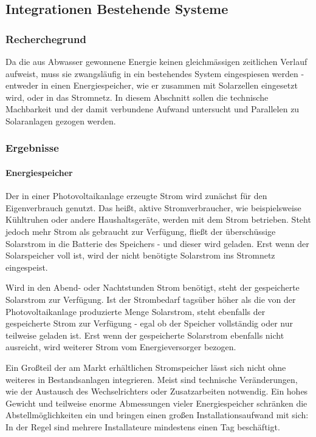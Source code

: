 \subsection{Integrationen Bestehende Systeme}

\subsubsection{Recherchegrund}

Da die aus Abwasser gewonnene Energie keinen gleichmässigen zeitlichen Verlauf aufweist, muss sie zwangsläufig in ein bestehendes System eingespiesen werden - entweder in einen Energiespeicher, wie er zusammen mit Solarzellen eingesetzt wird, oder in das Stromnetz. In diesem Abschnitt sollen die technische Machbarkeit und der damit verbundene Aufwand untersucht und Parallelen zu Solaranlagen gezogen werden.

\subsubsection{Ergebnisse}

\paragraph{Energiespeicher}

Der in einer Photovoltaikanlage erzeugte Strom wird zunächst für den Eigenverbrauch genutzt. Das heißt, aktive Stromverbraucher, wie beispielsweise Kühltruhen oder andere Haushaltsgeräte, werden mit dem Strom betrieben. Steht jedoch mehr Strom als gebraucht zur Verfügung, fließt der überschüssige Solarstrom in die Batterie des Speichers - und dieser wird geladen. Erst wenn der Solarspeicher voll ist, wird der nicht benötigte Solarstrom ins Stromnetz eingespeist.

Wird in den Abend- oder Nachtstunden Strom benötigt, steht der gespeicherte Solarstrom zur Verfügung. Ist der Strombedarf tagsüber höher als die von der Photovoltaikanlage produzierte Menge Solarstrom, steht ebenfalls der gespeicherte Strom zur Verfügung - egal ob der Speicher vollständig oder nur teilweise geladen ist. Erst wenn der gespeicherte Solarstrom ebenfalls nicht ausreicht, wird weiterer Strom vom Energieversorger bezogen.

Ein Großteil der am Markt erhältlichen Stromspeicher lässt sich nicht ohne weiteres in Bestandsanlagen integrieren. Meist sind technische Veränderungen, wie der Austausch des Wechselrichters oder Zusatzarbeiten notwendig. Ein hohes Gewicht und teilweise enorme Abmessungen vieler Energiespeicher schränken die Abstellmöglichkeiten ein und bringen einen großen Installationsaufwand mit sich: In der Regel sind mehrere Installateure mindestens einen Tag beschäftigt.

